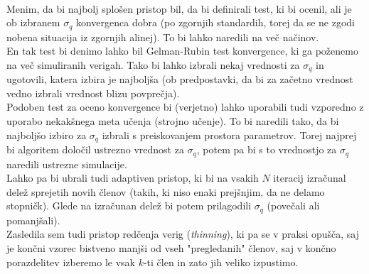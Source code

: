\documentclass[a4paper,11pt]{article}
\begin{document}
\\
Menim, da bi najbolj splošen pristop bil, da bi definirali test, ki bi ocenil, ali je ob izbranem $\sigma_q$ konvergenca dobra (po zgornjih standardih, torej da se ne zgodi nobena situacija iz zgornjih alinej).
To bi lahko naredili na več načinov.
\\
En tak test bi denimo lahko bil Gelman-Rubin test konvergence, ki ga poženemo na več simuliranih verigah. Tako bi lahko izbrali nekaj vrednosti za $\sigma_q$ in ugotovili, katera izbira je najboljša (ob predpostavki, da bi za začetno vrednost vedno izbrali vrednost blizu povprečja).
\\
Podoben test za oceno konvergence bi (verjetno) lahko uporabili tudi vzporedno z uporabo nekakšnega meta učenja (strojno učenje). To bi naredili tako, da bi najboljšo izbiro za $\sigma_q$ izbrali s preiskovanjem prostora parametrov. Torej najprej bi algoritem določil ustrezno vrednost za $\sigma_q$, potem pa bi s to vrednostjo za $\sigma_q$ naredili ustrezne simulacije.
\\
Lahko pa bi ubrali tudi adaptiven pristop, ki bi na vsakih $N$ iteracij izračunal delež sprejetih novih členov (takih, ki niso enaki prejšnjim, da ne delamo stopničk). Glede na izračunan delež bi potem prilagodili $\sigma_q$ (povečali ali pomanjšali).
\\
Zasledila sem tudi pristop redčenja verig (\textit{thinning}), ki pa se v praksi opušča, saj je končni vzorec bistveno manjši od vseh "pregledanih" členov, saj v končno porazdelitev izberemo le vsak $k$-ti člen in zato jih veliko izpustimo.
\end{document}
